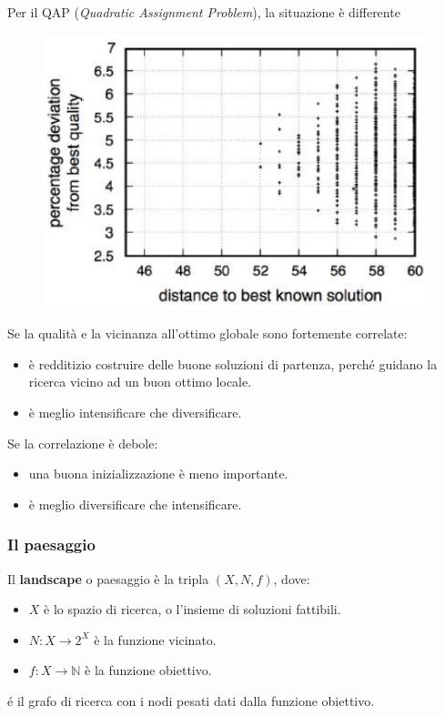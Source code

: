 \documentclass{article}
\begin{document}
Per il QAP (\textit{Quadratic Assignment Problem}), la situazione è differente
\begin{figure}[H]
    \centering
    \includegraphics[scale=0.5]{images/FDC.png}
\end{figure}
Se la qualità e la vicinanza all'ottimo globale sono fortemente correlate:
\begin{itemize}
    \item è redditizio costruire delle buone soluzioni di partenza, perché guidano la ricerca vicino
          ad un buon ottimo locale.
    \item è meglio intensificare che diversificare.
\end{itemize}
Se la correlazione è debole:
\begin{itemize}
    \item una buona inizializzazione è meno importante.
    \item è meglio diversificare che intensificare.
\end{itemize}

\subsubsection{Il paesaggio}
Il \textbf{landscape} o paesaggio è la tripla $(X,N,f)$, dove:
\begin{itemize}
    \item $X$ è lo spazio di ricerca, o l'insieme di soluzioni fattibili.
    \item $N:X\rightarrow 2^X$ è la funzione vicinato.
    \item $f:X\rightarrow\mathbb{N}$ è la funzione obiettivo.
\end{itemize}
é il grafo di ricerca con i nodi pesati dati dalla funzione obiettivo.
\end{document}
